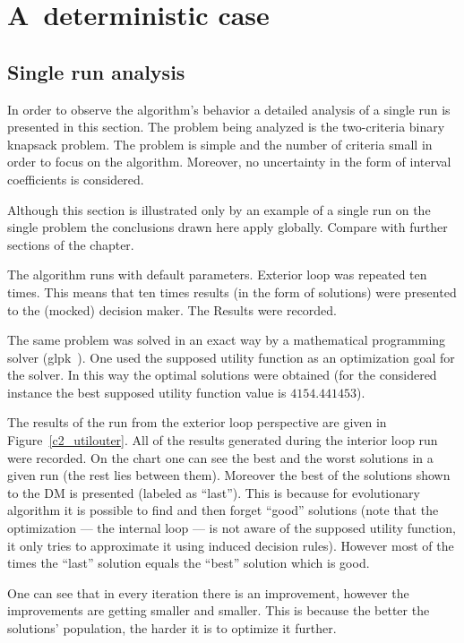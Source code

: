 \section{A~deterministic case}
\subsection{Single run analysis}
In order to observe the algorithm's behavior a detailed analysis of a single
run is presented in this section. The problem being analyzed is the
two-criteria binary knapsack problem. The problem is simple and
the number of criteria small in order to focus on the algorithm. Moreover, no
uncertainty in the form of interval coefficients is considered.

Although this section is illustrated only by an example of a single run on the
single problem the conclusions drawn here apply globally. Compare with
further sections of the chapter.

The algorithm runs with default parameters. Exterior loop was repeated ten
times. This means that ten times results (in the form of solutions) were
presented to the (mocked) decision maker. The Results were recorded.

The same problem was solved in an exact way by a mathematical programming
solver (glpk~\cite{Glpk}). One used the supposed utility function as an
optimization goal for the solver. In this way the optimal solutions were
obtained (for the considered instance the best supposed utility function value
is $4154.441453$).

The results of the run from the exterior loop perspective are given in
Figure~\ref{c2_utilouter}. All of the results generated during the interior
loop run were recorded. On the chart one can see the best and the worst
solutions in a given run (the rest lies between them). Moreover the best of
the solutions shown to the DM is presented (labeled as ``last''). This is
because for evolutionary algorithm it is possible to find and then forget
``good'' solutions (note that the optimization --- the internal loop --- is
not aware of the supposed utility function, it only tries to approximate it
using induced decision rules). However most of the times the ``last'' solution
equals the ``best'' solution which is good.

One can see that in every iteration there is an improvement, however the
improvements are getting smaller and smaller. This is because the better the
solutions' population, the harder it is to optimize it further.

